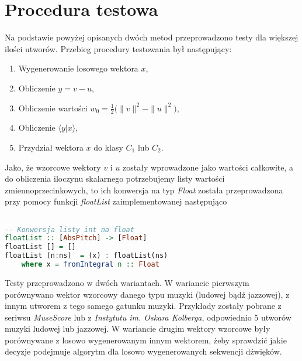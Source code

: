 \section{Procedura testowa}
Na podstawie powyżej opisanych dwóch metod przeprowadzono testy dla większej ilości utworów. Przebieg procedury testowania był następujący:
\begin{enumerate}
    \item Wygenerowanie losowego wektora $x$,
    \item Obliczenie $y = v - u$,
    \item Obliczenie wartości $w_{0} =\frac{1}{2} \big(\|v\|^{2} - \|u\|^{2}\big)$,
    \item Obliczenie $\big \langle y|x \big \rangle$,
    \item Przydział wektora $x$ do klasy $C_{1}$ lub $C_{2}$.
\end{enumerate}

Jako, że wzorcowe wektory $v$ i $u$ zostały wprowadzone jako wartości całkowite, a do obliczenia iloczynu skalarnego potrzebujemy listy wartości zmiennoprzecinkowych, to ich konwersja na typ \textit{Float} została przeprowadzona przy pomocy funkcji \textit{floatList} zaimplementowanej następująco

\begin{lstlisting}[language = Haskell]

-- Konwersja listy int na float
floatList :: [AbsPitch] -> [Float]
floatList [] = []
floatList (n:ns)  = (x) : floatList(ns)
    where x = fromIntegral n :: Float 
\end{lstlisting}

Testy przeprowadzono w dwóch wariantach. W wariancie pierwszym porównywano wektor wzorcowy danego typu muzyki (ludowej bądź jazzowej), z innym utworem z tego samego gatunku muzyki. Przykłady zostały pobrane z seriwsu \textit{MuseScore} lub z \textit{Instytutu im. Oskara Kolberga}, odpowiednio 5 utworów muzyki ludowej lub jazzowej. W wariancie drugim wektory wzorcowe były porównywane z losowo wygenerowanym innym wektorem, żeby sprawdzić jakie decyzje podejmuje algorytm dla losowo wygenerowanych sekwencji dźwięków. 

